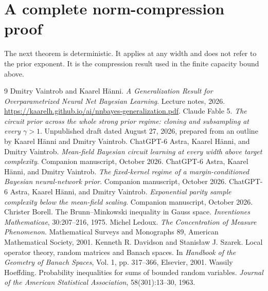 \documentclass[11pt]{article}
\theoremstyle{definition}
\begin{document}
\appendix
\section{A complete norm-compression proof}\label{sec:compression}
The next theorem is deterministic. It applies at any width and does not refer to the prior exponent. It is the compression result used in the finite capacity bound above.


\begin{thebibliography}{9}
 Dmitry Vaintrob and Kaarel H\"anni.
\emph{A Generalization Result for Overparametrized Neural Net Bayesian Learning}.
Lecture notes, 2026.
\url{https://kaarelh.github.io/ai/nnbayes-generalization.pdf}.
 Claude Fable 5.
\emph{The circuit prior across the whole strong prior regime: cloning and subsampling at every $\gamma>1$}.
Unpublished draft dated August 27, 2026, prepared from an outline by Kaarel H\"anni and Dmitry Vaintrob.
 ChatGPT-6 Astra, Kaarel H\"anni, and Dmitry Vaintrob.
\emph{Mean-field Bayesian circuit learning at every width above target complexity}.
Companion manuscript, October 2026.
 ChatGPT-6 Astra, Kaarel H\"anni, and Dmitry Vaintrob.
\emph{The fixed-kernel regime of a margin-conditioned Bayesian neural-network prior}.
Companion manuscript, October 2026.
 ChatGPT-6 Astra, Kaarel H\"anni, and Dmitry Vaintrob.
\emph{Exponential parity sample complexity below the mean-field scaling}.
Companion manuscript, October 2026.
 Christer Borell.
The Brunn--Minkowski inequality in Gauss space.
\emph{Inventiones Mathematicae}, 30:207--216, 1975.
 Michel Ledoux.
\emph{The Concentration of Measure Phenomenon}.
Mathematical Surveys and Monographs 89, American Mathematical Society, 2001.
 Kenneth R. Davidson and Stanis\l aw J. Szarek.
Local operator theory, random matrices and Banach spaces.
In \emph{Handbook of the Geometry of Banach Spaces}, Vol. 1, pp. 317--366, Elsevier, 2001.
 Wassily Hoeffding.
Probability inequalities for sums of bounded random variables.
\emph{Journal of the American Statistical Association}, 58(301):13--30, 1963.
\end{thebibliography}
\end{document}
